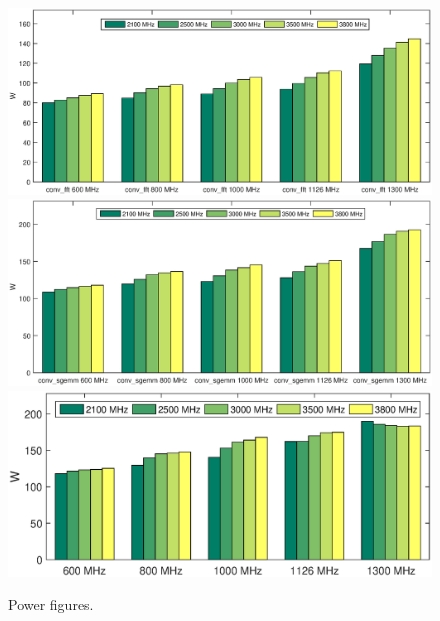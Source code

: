 \documentclass[conference]{IEEEtran}
\begin{document}
\begin{figure}[ht]
	\centering     %
	\subfigure%
	{
		\includegraphics[width=0.9\linewidth]{power_fft.eps}
	}
	\subfigure%
	{
		\includegraphics[width=0.9\linewidth]{power_sgemm.eps}
	}
	\subfigure%
	{
		\includegraphics[width=0.9\linewidth]{power_winograd.eps}
	}
	\caption{\label{fig:power} Power figures.}
\end{figure}	
	
\end{document}
